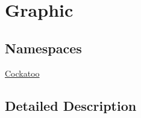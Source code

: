 \hypertarget{group__Graphic}{}\section{Graphic}
\label{group__Graphic}
\subsection*{Namespaces}
\begin{DoxyCompactItemize}
\item 
 \hyperlink{namespaceCockatoo}{Cockatoo}
\end{DoxyCompactItemize}


\subsection{Detailed Description}
